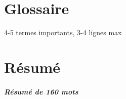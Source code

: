 \documentclass[a4paper, BCOR=0mm, fontsize=12pt, titlepage=firstiscover]{scrreprt}
\begin{document}
		
	\chapter{Glossaire}
		4-5 termes importants, 3-4 lignes max
		

		\printindex
		\printglossaries
	
		
		
	\chapter{Résumé}
		\paragraph{Résumé de 160 mots}
		
		
	
	
\end{document}
